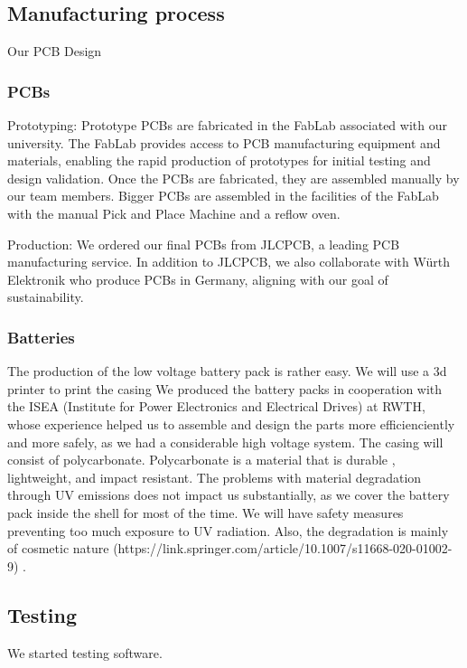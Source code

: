\subsection{Manufacturing process}
Our PCB Design
\subsubsection{PCBs}
\par Prototyping: Prototype PCBs are fabricated in the FabLab associated with our university. The FabLab provides access to PCB manufacturing equipment and materials, enabling the rapid production of prototypes for initial testing and design validation.
    Once the PCBs are fabricated, they are assembled manually by our team members. Bigger PCBs are assembled in the facilities of the FabLab with the manual Pick and Place Machine and a reflow oven.
\par Production: We ordered our final PCBs from JLCPCB, a leading PCB manufacturing service. In addition to JLCPCB, we also collaborate with Würth Elektronik who produce 
PCBs in Germany, aligning with our goal of sustainability.
\subsubsection{Batteries}
The production of the low voltage battery pack is rather easy. We will use a 3d printer to print the casing
We produced the battery packs in cooperation with the ISEA (Institute for Power Electronics and Electrical Drives) at RWTH, whose experience helped us to assemble and design the parts
more efficienciently and more safely, as we had a considerable high voltage system.
The casing will consist of polycarbonate. Polycarbonate is a material that is
durable , lightweight, and impact resistant. The problems with
material degradation through UV emissions does not impact us substantially, as we
cover the battery pack inside the shell for most of the time. We will have safety measures preventing too much exposure to UV radiation.
Also, the degradation is mainly of cosmetic nature (https://link.springer.com/article/10.1007/s11668-020-01002-9) .

\subsection{Testing}
We started testing software.

